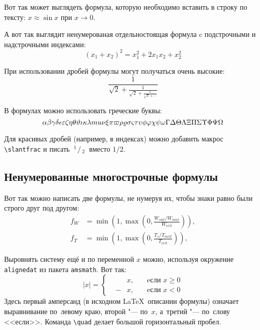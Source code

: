 Вот так может выглядеть формула, которую необходимо вставить в строку по тексту: $x \approx \sin x$ при $x \to 0$.

А вот так выглядит ненумерованая отдельностоящая формула c подстрочными и надстрочными индексами:
\[
(x_1+x_2)^2 = x_1^2 + 2 x_1 x_2 + x_2^2
\]

При использовании дробей формулы могут получаться очень высокие:
\[
  \frac{1}{\sqrt{2}+
  \displaystyle\frac{1}{\sqrt{2}+
  \displaystyle\frac{1}{\sqrt{2}+\cdots}}}
\]

В формулах можно использовать греческие буквы:
\[
\alpha\beta\gamma\delta\epsilon\varepsilon\zeta\eta\theta\vartheta\iota\kappa\lambda\\mu\nu\xi\pi\varpi\rho\varrho\sigma\varsigma\tau\upsilon\phi\varphi\chi\psi\omega\Gamma\Delta\Theta\Lambda\Xi\Pi\Sigma\Upsilon\Phi\Psi\Omega
\]

\def\slantfrac#1#2{ \hspace{3pt}\!^{#1}\!\!\hspace{1pt}/
  \hspace{2pt}\!\!_{#2}\!\hspace{3pt}
} %
Для красивых дробей (например, в индексах) можно добавить макрос
\verb+\slantfrac+ и писать $\slantfrac{1}{2}$ вместо $1/2$.

\subsection{Ненумерованные многострочные формулы} \label{subsect1_3_2}

Вот так можно написать две формулы, не нумеруя их, чтобы знаки равно были строго друг под другом:
\begin{align}
  f_W & =  \min \left( 1, \max \left( 0, \frac{W_{soil} / W_{max}}{W_{crit}} \right)  \right), \nonumber \\
  f_T & =  \min \left( 1, \max \left( 0, \frac{T_s / T_{melt}}{T_{crit}} \right)  \right), \nonumber
\end{align}

Выровнять систему ещё и по переменной $ x $ можно, используя окружение \verb|alignedat| из пакета \verb|amsmath|. Вот так: 
\[
    |x| = \left\{
    \begin{alignedat}{2}
        &&x, \quad &\text{eсли } x\geqslant 0 \\
        &-&x, \quad & \text{eсли } x<0
    \end{alignedat}
    \right.
\]
Здесь первый амперсанд (в исходном \LaTeX\ описании формулы) означает выравнивание по~левому краю, второй "--- по~$ x $, а~третий "--- по~слову <<если>>. Команда \verb|\quad| делает большой горизонтальный пробел.

